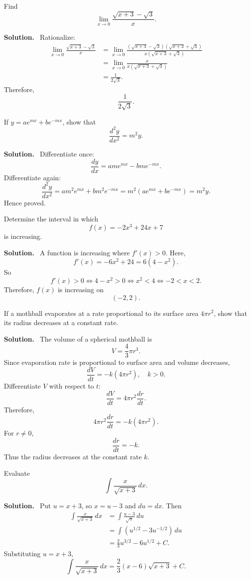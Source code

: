\documentclass[11pt,a4paper]{article}
\newcommand{\question}[2]{\begin{tcolorbox}[breakable,colback=gray!5,colframe=black!35,title=\textbf{Question #1}]#2\end{tcolorbox}}
\newcommand{\answer}{\textbf{Solution.}\ }
\begin{document}
\question{3(a)}{Find
\[
\lim_{x\to0}\frac{\sqrt{x+3}-\sqrt3}{x}.
\]}
\answer
Rationalize:
\begin{align*}
\lim_{x\to0}\frac{\sqrt{x+3}-\sqrt3}{x}
&=\lim_{x\to0}\frac{(\sqrt{x+3}-\sqrt3)(\sqrt{x+3}+\sqrt3)}{x(\sqrt{x+3}+\sqrt3)}\\
&=\lim_{x\to0}\frac{x}{x(\sqrt{x+3}+\sqrt3)}\\
&=\frac{1}{2\sqrt3}.
\end{align*}
Therefore,
\[
\boxed{\frac{1}{2\sqrt3}}.
\]

\question{3(b)}{If $y=ae^{mx}+be^{-mx}$, show that
\[
\frac{d^2y}{dx^2}=m^2y.
\]}
\answer
Differentiate once:
\[
\frac{dy}{dx}=am e^{mx}-bm e^{-mx}.
\]
Differentiate again:
\[
\frac{d^2y}{dx^2}=am^2e^{mx}+bm^2e^{-mx}
=m^2(ae^{mx}+be^{-mx})=m^2y.
\]
Hence proved.

\question{3(c)}{Determine the interval in which
\[
f(x)=-2x^3+24x+7
\]
is increasing.}
\answer
A function is increasing where $f'(x)>0$. Here,
\[
f'(x)=-6x^2+24=6(4-x^2).
\]
So
\[
f'(x)>0\iff 4-x^2>0\iff x^2<4\iff -2<x<2.
\]
Therefore, $f(x)$ is increasing on
\[
\boxed{(-2,2).}
\]

\begin{center}
\end{center}

\question{3(d)}{If a mothball evaporates at a rate proportional to its surface area $4\pi r^2$, show that its radius decreases at a constant rate.}
\answer
The volume of a spherical mothball is
\[
V=\frac{4}{3}\pi r^3.
\]
Since evaporation rate is proportional to surface area and volume decreases,
\[
\frac{dV}{dt}=-k(4\pi r^2),\quad k>0.
\]
Differentiate $V$ with respect to $t$:
\[
\frac{dV}{dt}=4\pi r^2\frac{dr}{dt}.
\]
Therefore,
\[
4\pi r^2\frac{dr}{dt}=-k(4\pi r^2).
\]
For $r\ne0$,
\[
\frac{dr}{dt}=-k.
\]
Thus the radius decreases at the constant rate $k$.

\question{4(a)}{Evaluate
\[
\int \frac{x}{\sqrt{x+3}}\,dx.
\]}
\answer
Put $u=x+3$, so $x=u-3$ and $du=dx$. Then
\begin{align*}
\int \frac{x}{\sqrt{x+3}}\,dx
&=\int \frac{u-3}{\sqrt u}\,du\\
&=\int (u^{1/2}-3u^{-1/2})\,du\\
&=\frac{2}{3}u^{3/2}-6u^{1/2}+C.
\end{align*}
Substituting $u=x+3$,
\[
\boxed{\int \frac{x}{\sqrt{x+3}}\,dx=\frac{2}{3}(x-6)\sqrt{x+3}+C.}
\]
\end{document}
